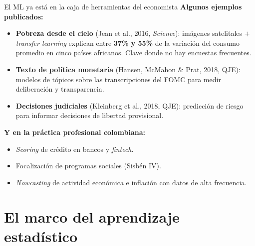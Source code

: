 \documentclass{beamer}
\newcommand{\1}{\mathbb{I}}
\begin{document}
\begin{frame}{El ML ya está en la caja de herramientas del economista}
\small
\textbf{Algunos ejemplos publicados:}
\begin{itemize}\itemsep5pt
  \item \textbf{Pobreza desde el cielo} (Jean et al., 2016, \emph{Science}): imágenes satelitales $+$ \emph{transfer learning} explican entre \textbf{37\% y 55\%} de la variación del consumo promedio en cinco países africanos. Clave donde no hay encuestas frecuentes. \pause
  \item \textbf{Texto de política monetaria} (Hansen, McMahon \& Prat, 2018, QJE): modelos de tópicos sobre las transcripciones del FOMC para medir deliberación y transparencia. \pause
  \item \textbf{Decisiones judiciales} (Kleinberg et al., 2018, QJE): predicción de riesgo para informar decisiones de libertad provisional. \pause
\end{itemize}

\vspace{0.2cm}
\textbf{Y en la práctica profesional colombiana:}
\begin{itemize}\itemsep3pt
  \item \emph{Scoring} de crédito en bancos y \emph{fintech}.
  \item Focalización de programas sociales (Sisbén IV).
  \item \emph{Nowcasting} de actividad económica e inflación con datos de alta frecuencia.
\end{itemize}
\end{frame}


\section{El marco del aprendizaje estadístico}
\begin{frame}[noframenumbering]
\tableofcontents[currentsection]
\end{frame}
\end{document}
